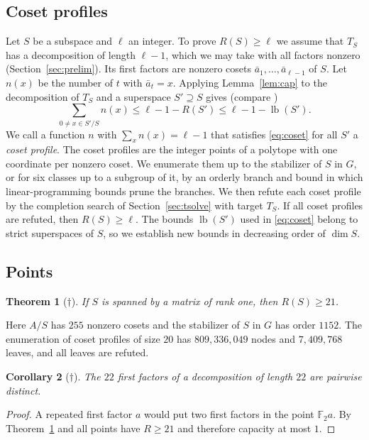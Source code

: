\documentclass[11pt]{amsart}
\newtheorem{theorem}{Theorem}[section]
\newtheorem{corollary}[theorem]{Corollary}
\theoremstyle{definition}
\theoremstyle{remark}
\numberwithin{equation}{section}
\newcommand{\F}{\mathbb{F}_2}
\newcommand{\lb}{\operatorname{lb}}
\begin{document}
\subsection{Coset profiles}\label{subsec:profiles}
Let $S$ be a subspace and $\ell$ an integer. To prove $R(S)\ge\ell$ we assume that $T_S$ has a decomposition of length $\ell-1$, which we may take with all factors nonzero (Section~\ref{sec:prelim}). Its first factors are nonzero cosets $\bar a_1,\dots,\bar a_{\ell-1}$ of $S$. Let $n(x)$ be the number of $t$ with $\bar a_t=x$. Applying Lemma~\ref{lem:cap} to the decomposition of $T_S$ and a superspace $S'\supseteq S$ gives (compare \cite[Lemma~2.2]{Yan26})
\begin{equation}\label{eq:coset}
\sum_{0\ne x\in S'/S} n(x)\le \ell-1-R(S')\le \ell-1-\lb(S').
\end{equation}
We call a function $n$ with $\sum_x n(x)=\ell-1$ that satisfies \eqref{eq:coset} for all $S'$ a \emph{coset profile}. The coset profiles are the integer points of a polytope with one coordinate per nonzero coset. We enumerate them up to the stabilizer of $S$ in $G$, or for six classes up to a subgroup of it, by an orderly branch and bound in which linear-programming bounds prune the branches. We then refute each coset profile by the completion search of Section~\ref{sec:tsolve} with target $T_S$. If all coset profiles are refuted, then $R(S)\ge\ell$. The bounds $\lb(S')$ used in \eqref{eq:coset} belong to strict superspaces of $S$, so we establish new bounds in decreasing order of $\dim S$.

\subsection{Points}
\begin{theorem}[$\dagger$]\label{thm:point}
If $S$ is spanned by a matrix of rank one, then $R(S)\ge 21$.
\end{theorem}

Here $A/S$ has $255$ nonzero cosets and the stabilizer of $S$ in $G$ has order $1152$. The enumeration of coset profiles of size $20$ has $809{,}336{,}049$ nodes and $7{,}409{,}768$ leaves, and all leaves are refuted.

\begin{corollary}[$\dagger$]\label{cor:distinct}
The $22$ first factors of a decomposition of length $22$ are pairwise distinct.
\end{corollary}

\begin{proof}
A repeated first factor $a$ would put two first factors in the point $\F a$. By Theorem~\ref{thm:point} and \cite{RR26} all points have $R\ge 21$ and therefore capacity at most $1$.
\end{proof}
\end{document}
